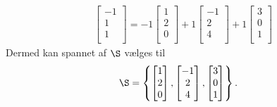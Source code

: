 \begin{eks}
%
  \begin{align*}
    \begin{bmatrix}
           -1 \\
           1 \\
           1 \\
         \end{bmatrix}
         = 
         -1 \begin{bmatrix}
           1 \\
           2 \\
           0 \\
         \end{bmatrix}
         +1
         \begin{bmatrix}
           -1 \\
           2 \\
           4 \\
         \end{bmatrix}
          +1
         \begin{bmatrix}
           3 \\
           0 \\
           1 \\
         \end{bmatrix}
  \end{align*} 
%
Dermed kan spannet af $\S$ vælges til
%
\begin{align*}
\S &= \left\{
\begin{bmatrix}
           1 \\
           2 \\
           0 \\
\end{bmatrix}
,
\begin{bmatrix}
           -1 \\
           2 \\
           4 \\
\end{bmatrix}
,
\begin{bmatrix}
           3 \\
           0 \\
           1 \\
\end{bmatrix}
\right\}.
\end{align*}
\end{eks}
%
%

